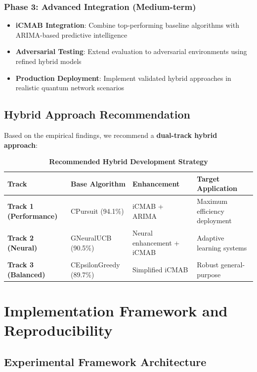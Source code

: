 \documentclass[12pt,a4paper]{article}
\newcommand{\success}[1]{\textcolor{successcolor}{\textbf{#1}}}
\begin{document}
\subsubsection{Phase 3: Advanced Integration (Medium-term)}
\begin{itemize}
\item \textbf{iCMAB Integration}: Combine top-performing baseline algorithms with ARIMA-based predictive intelligence
\item \textbf{Adversarial Testing}: Extend evaluation to adversarial environments using refined hybrid models
\item \textbf{Production Deployment}: Implement validated hybrid approaches in realistic quantum network scenarios
\end{itemize}

\subsection{Hybrid Approach Recommendation}

Based on the empirical findings, we recommend a \textbf{dual-track hybrid approach}:

\begin{table}[H]
\centering
\caption{\success{Recommended Hybrid Development Strategy}}
\begin{tabular}{|l|l|l|l|}
\hline
\textbf{Track} & \textbf{Base Algorithm} & \textbf{Enhancement} & \textbf{Target Application} \\
\hline
\hline
\success{Track 1 (Performance)} & CPursuit (94.1\%) & iCMAB + ARIMA & Maximum efficiency deployment \\
\success{Track 2 (Neural)} & GNeuralUCB (90.5\%) & Neural enhancement + iCMAB & Adaptive learning systems \\
\success{Track 3 (Balanced)} & CEpsilonGreedy (89.7\%) & Simplified iCMAB & Robust general-purpose \\
\hline
\end{tabular}
\end{table}

\section{Implementation Framework and Reproducibility}

\subsection{Experimental Framework Architecture}
\end{document}
